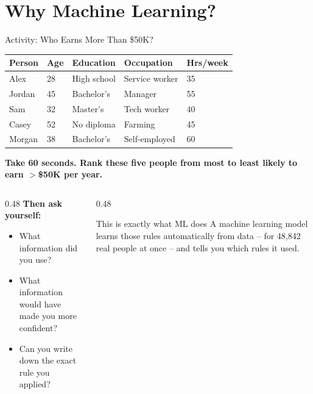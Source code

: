 \documentclass[aspectratio=169, 10pt]{beamer}
\begin{document}
\section{Why Machine Learning?}

\begin{frame}{Activity: Who Earns More Than \$50K?}

\begin{center}
\small
\renewcommand{\arraystretch}{1.35}
\begin{tabular}{lllll}
\toprule
\textbf{Person} & \textbf{Age} & \textbf{Education} & \textbf{Occupation} & \textbf{Hrs/week} \\
\midrule
Alex   & 28 & High school    & Service worker   & 35 \\
Jordan & 45 & Bachelor's     & Manager          & 55 \\
Sam    & 32 & Master's       & Tech worker      & 40 \\
Casey  & 52 & No diploma     & Farming          & 45 \\
Morgan & 38 & Bachelor's     & Self-employed    & 60 \\
\bottomrule
\end{tabular}
\end{center}

\vspace{0.5em}
\textbf{Take 60 seconds. Rank these five people from most to least likely to earn $>$\$50K per year.}

\vspace{0.6em}
\begin{columns}[T]
\begin{column}{0.48\textwidth}
\textbf{Then ask yourself:}
\begin{itemize}
  \setlength\itemsep{0.3em}
  \item What information did you use?
  \item What information would have made you more confident?
  \item Can you write down the exact rule you applied?
\end{itemize}
\end{column}
\begin{column}{0.48\textwidth}
\begin{alertblock}{This is exactly what ML does}
A machine learning model learns those rules automatically from data -- for 48,842 real people at once -- and tells you which rules it used.
\end{alertblock}
\end{column}
\end{columns}
\end{frame}
\end{document}
